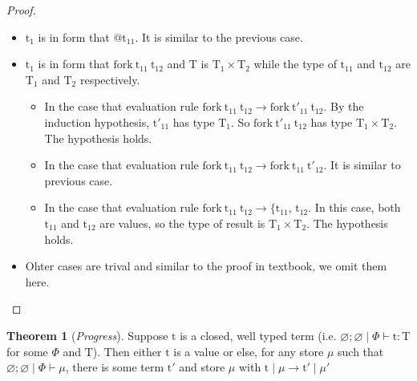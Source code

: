 \documentclass[10pt]{article}
\newcommand{\lto}{\longrightarrow}
\let\emptyset\varnothing
\theoremstyle{definition}\newtheorem*{theorem}{Theorem}
\theoremstyle{definition}\newtheorem*{definition}{Definition}
\begin{document}
\begin{proof}
\begin{itemize}
\begin{itemize}
                    \end{itemize}
                \item $\mathrm{t_1}$ is in form that $@\mathrm{t_{11}}$. It is similar to the previous case.
                \item $\mathrm{t_1}$ is in form that $\mathrm{fork}\ \mathrm{t_{11}}\ \mathrm{t_{12}}$ and $\mathrm{T}$ is $\mathrm{T_1}\times\mathrm{T_2}$ while the type of $\mathrm{t_{11}}$ and $\mathrm{t_{12}}$ are $\mathrm{T_1}$ and $\mathrm{T_2}$ respectively.
                    \begin{itemize}
                        \item In the case that evaluation rule $\mathrm{fork}\ \mathrm{t_{11}}\ \mathrm{t_{12}} \lto \mathrm{fork}\ \mathrm{t'_{11}}\ \mathrm{t_{12}}$. By the induction hypothesis, $\mathrm{t'_{11}}$ has type $\mathrm{T_1}$. So $\mathrm{fork}\ \mathrm{t'_{11}}\ \mathrm{t_{12}}$ has type $\mathrm{T_1}\times\mathrm{T_2}$.
                            The hypothesis holds.
                        \item In the case that evaluation rule $\mathrm{fork}\ \mathrm{t_{11}}\ \mathrm{t_{12}} \lto \mathrm{fork}\ \mathrm{t_{11}}\ \mathrm{t'_{12}}$. It is similar to previous case.
                        \item In the case that evaluation rule $\mathrm{fork}\ \mathrm{t_{11}}\ \mathrm{t_{12}} \lto \{\mathrm{t_{11}},\,\mathrm{t_{12}}$. In this case, both $\mathrm{t_{11}}$ and $\mathrm{t_{12}}$ are values, so the type of result is $\mathrm{T_1}\times\mathrm{T_2}$. The hypothesis holds.
                    \end{itemize}
                \item Ohter cases are trival and similar to the proof in textbook, we omit them here.
        \end{itemize}
    \end{proof}
    \begin{theorem}[{\it Progress}]
        Suppose $\mathrm{t}$ is a closed, well typed term 
        (i.e. $\emptyset;\emptyset\mid\Phi\vdash\mathrm{t}\colon\mathrm{T}$ for some $\Phi$ and $\mathrm{T}$). 
        Then either $\mathrm{t}$ is a value or else, for any store $\mu$ such that $\emptyset;\emptyset\mid\Phi\vdash\mu$, 
        there is some term $\mathrm{t'}$ and store $\mu$ with $\mathrm{t}\mid\mu\lto\mathrm{t'}\mid\mu'$
    \end{theorem}
\end{document}
